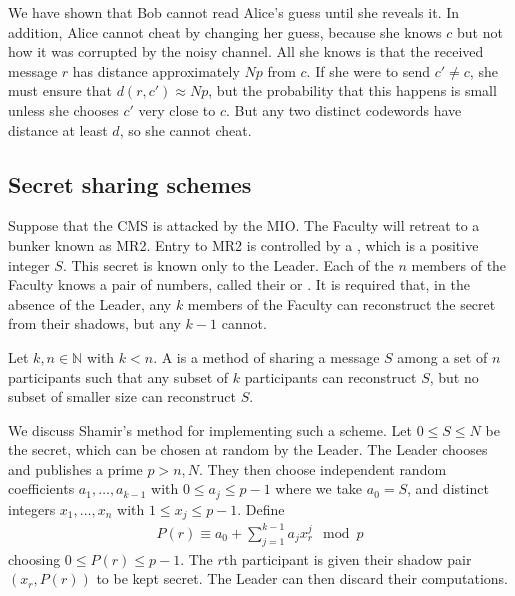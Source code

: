We have shown that Bob cannot read Alice's guess until she reveals it.
In addition, Alice cannot cheat by changing her guess, because she knows $c$ but not how it was corrupted by the noisy channel.
All she knows is that the received message $r$ has distance approximately $Np$ from $c$.
If she were to send $c' \neq c$, she must ensure that $d(r,c') \approx Np$, but the probability that this happens is small unless she chooses $c'$ very close to $c$.
But any two distinct codewords have distance at least $d$, so she cannot cheat.

\subsection{Secret sharing schemes}
Suppose that the CMS is attacked by the MIO.
The Faculty will retreat to a bunker known as MR2.
Entry to MR2 is controlled by a , which is a positive integer $S$.
This secret is known only to the Leader.
Each of the $n$ members of the Faculty knows a pair of numbers, called their  or .
It is required that, in the absence of the Leader, any $k$ members of the Faculty can reconstruct the secret from their shadows, but any $k-1$ cannot.
\begin{definition}
    Let $k, n \in \mathbb N$ with $k < n$.
    A  is a method of sharing a message $S$ among a set of $n$ participants such that any subset of $k$ participants can reconstruct $S$, but no subset of smaller size can reconstruct $S$.
\end{definition}
We discuss Shamir's method for implementing such a scheme.
Let $0 \leq S \leq N$ be the secret, which can be chosen at random by the Leader.
The Leader chooses and publishes a prime $p > n, N$.
They then choose independent random coefficients $a_1, \dots, a_{k-1}$ with $0 \leq a_j \leq p-1$ where we take $a_0 = S$, and distinct integers $x_1, \dots, x_n$ with $1 \leq x_j \leq p-1$.
Define
\begin{align*}
    P(r) \equiv a_0 + \sum_{j=1}^{k-1} a_j x_r^j \mod p
\end{align*}
choosing $0 \leq P(r) \leq p-1$.
The $r$th participant is given their shadow pair $(x_r, P(r))$ to be kept secret.
The Leader can then discard their computations.

